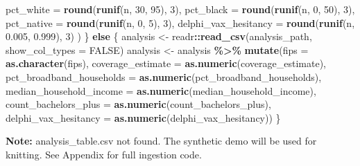 \documentclass[
  11pt,
]{article}
\newenvironment{Shaded}{\begin{snugshade}}{\end{snugshade}}
\newcommand{\AttributeTok}[1]{\textcolor[rgb]{0.13,0.29,0.53}{#1}}
\newcommand{\ConstantTok}[1]{\textcolor[rgb]{0.56,0.35,0.01}{#1}}
\newcommand{\ControlFlowTok}[1]{\textcolor[rgb]{0.13,0.29,0.53}{\textbf{#1}}}
\newcommand{\DecValTok}[1]{\textcolor[rgb]{0.00,0.00,0.81}{#1}}
\newcommand{\FloatTok}[1]{\textcolor[rgb]{0.00,0.00,0.81}{#1}}
\newcommand{\FunctionTok}[1]{\textcolor[rgb]{0.13,0.29,0.53}{\textbf{#1}}}
\newcommand{\NormalTok}[1]{#1}
\newcommand{\OtherTok}[1]{\textcolor[rgb]{0.56,0.35,0.01}{#1}}
\newcommand{\SpecialCharTok}[1]{\textcolor[rgb]{0.81,0.36,0.00}{\textbf{#1}}}
\begin{document}
\begin{Shaded}
\begin{Highlighting}[]
    \AttributeTok{pct\_white =} \FunctionTok{round}\NormalTok{(}\FunctionTok{runif}\NormalTok{(n, }\DecValTok{30}\NormalTok{, }\DecValTok{95}\NormalTok{), }\DecValTok{3}\NormalTok{),}
    \AttributeTok{pct\_black =} \FunctionTok{round}\NormalTok{(}\FunctionTok{runif}\NormalTok{(n, }\DecValTok{0}\NormalTok{, }\DecValTok{50}\NormalTok{), }\DecValTok{3}\NormalTok{),}
    \AttributeTok{pct\_native =} \FunctionTok{round}\NormalTok{(}\FunctionTok{runif}\NormalTok{(n, }\DecValTok{0}\NormalTok{, }\DecValTok{5}\NormalTok{), }\DecValTok{3}\NormalTok{),}
    \AttributeTok{delphi\_vax\_hesitancy =} \FunctionTok{round}\NormalTok{(}\FunctionTok{runif}\NormalTok{(n, }\FloatTok{0.005}\NormalTok{, }\FloatTok{0.999}\NormalTok{), }\DecValTok{3}\NormalTok{)}
\NormalTok{  )}
\NormalTok{\} }\ControlFlowTok{else}\NormalTok{ \{}
\NormalTok{  analysis }\OtherTok{\textless{}{-}}\NormalTok{ readr}\SpecialCharTok{::}\FunctionTok{read\_csv}\NormalTok{(analysis\_path, }\AttributeTok{show\_col\_types =} \ConstantTok{FALSE}\NormalTok{)}
\NormalTok{  analysis }\OtherTok{\textless{}{-}}\NormalTok{ analysis }\SpecialCharTok{\%\textgreater{}\%}
    \FunctionTok{mutate}\NormalTok{(}\AttributeTok{fips =} \FunctionTok{as.character}\NormalTok{(fips),}
           \AttributeTok{coverage\_estimate =} \FunctionTok{as.numeric}\NormalTok{(coverage\_estimate),}
           \AttributeTok{pct\_broadband\_households =} \FunctionTok{as.numeric}\NormalTok{(pct\_broadband\_households),}
           \AttributeTok{median\_household\_income =} \FunctionTok{as.numeric}\NormalTok{(median\_household\_income),}
           \AttributeTok{count\_bachelors\_plus =} \FunctionTok{as.numeric}\NormalTok{(count\_bachelors\_plus),}
           \AttributeTok{delphi\_vax\_hesitancy =} \FunctionTok{as.numeric}\NormalTok{(delphi\_vax\_hesitancy))}
\NormalTok{\}}
\end{Highlighting}
\end{Shaded}

\textbf{Note:} analysis\_table.csv not found. The synthetic demo will be
used for knitting. See Appendix for full ingestion code.
\end{document}
